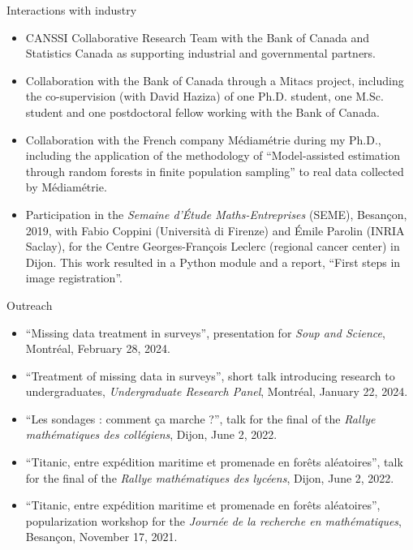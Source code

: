 \documentclass{resume}
\begin{document}
\begin{rSection}{Interactions with industry}
\vspace{2mm}
\begin{itemize}
  \item[--] CANSSI Collaborative Research Team with the Bank of Canada and Statistics Canada as supporting industrial and governmental partners.
  \item[--] Collaboration with the Bank of Canada through a Mitacs project, including the co-supervision (with David Haziza) of one Ph.D. student, one M.Sc. student and one postdoctoral fellow working with the Bank of Canada.
  \item[--] Collaboration with the French company Médiamétrie during my Ph.D., including the application of the methodology of ``Model-assisted estimation through random forests in finite population sampling'' to real data collected by Médiamétrie.
  \item[--] Participation in the \textit{Semaine d'Étude Maths-Entreprises} (SEME), Besançon, 2019, with Fabio Coppini (Università di Firenze) and Émile Parolin (INRIA Saclay), for the Centre Georges-François Leclerc (regional cancer center) in Dijon. This work resulted in a Python module and a report, ``First steps in image registration''.
\end{itemize}
\end{rSection}

\begin{rSection}{Outreach}
\vspace{2mm}
\begin{itemize}
  \item[--] ``Missing data treatment in surveys'', presentation for \emph{Soup and Science}, Montréal, February 28, 2024.
  \item[--] ``Treatment of missing data in surveys'', short talk introducing research to undergraduates, \emph{Undergraduate Research Panel}, Montréal, January 22, 2024.
  \item[--] ``Les sondages : comment ça marche ?'', talk for the final of the \emph{Rallye mathématiques des collégiens}, Dijon, June 2, 2022.
  \item[--] ``Titanic, entre expédition maritime et promenade en forêts aléatoires'', talk for the final of the \emph{Rallye mathématiques des lycéens}, Dijon, June 2, 2022.
  \item[--] ``Titanic, entre expédition maritime et promenade en forêts aléatoires'', popularization workshop for the \emph{Journée de la recherche en mathématiques}, Besançon, November 17, 2021.
\end{itemize}
\end{rSection}
\end{document}
